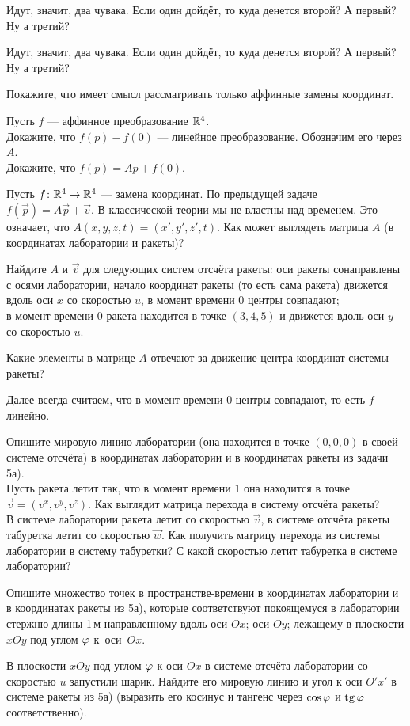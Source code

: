 \documentclass[a4paper,12pt]{article}
\begin{document}
  Идут, значит, два чувака.
    Если один дойдёт, то куда денется второй?
    А первый?
    Ну а третий?

  Идут, значит, два чувака.
    Если один дойдёт, то куда денется второй?
    А первый?
    Ну а третий?


  Покажите, что имеет смысл рассматривать только аффинные замены координат.

  Пусть $f$ --- аффинное преобразование $\mathbb{R}^4$.\\
    Докажите, что $f(p)-f(0)$ --- линейное преобразование. Обозначим его через $A$.\\
    Докажите, что $f(p) = Ap + f(0)$.


  Пусть $f\colon\mathbb{R}^4\rightarrow\mathbb{R}^4$ --- замена координат. По предыдущей задаче $f(\vec{p}) = A\vec{p} + \vec{v}$. В классической теории мы не властны над временем. Это означает, что $A(x,y,z,t)=(x',y',z',t)$.
  Как может выглядеть матрица $A$ (в координатах лаборатории и ракеты)?

  Найдите $A$ и $\vec{v}$ для следующих систем отсчёта ракеты:
    оси ракеты сонаправлены с осями лаборатории, начало координат ракеты (то есть сама ракета) движется вдоль оси $x$ со скоростью $u$, в момент времени $0$ центры совпадают;
\\
    в момент времени $0$ ракета находится в точке $(3,4,5)$ и движется вдоль оси $y$ со скоростью $u$.

  Какие элементы в матрице $A$ отвечают за движение центра координат системы ракеты?

Далее всегда считаем, что в момент времени $0$ центры совпадают, то есть $f$ линейно.

    Опишите мировую линию лаборатории (она находится в точке $(0,0,0)$ в своей системе отсчёта) в координатах лаборатории и в координатах ракеты из задачи 5а).\\
    Пусть ракета летит так, что в момент времени $1$ она находится в точке $\vec{v}=(v^x,v^y,v^z)$. Как выглядит матрица перехода в систему отсчёта ракеты?\\
    В системе лаборатории ракета летит со скоростью $\vec{v}$, в системе отсчёта ракеты табуретка летит со скоростью $\vec{w}$. Как получить матрицу перехода из системы лаборатории в систему табуретки? С какой скоростью летит табуретка в системе лаборатории?

  Опишите множество точек в пространстве-времени в координатах лаборатории и в координатах ракеты из 5а), которые соответствуют покоящемуся в лаборатории стержню длины 1\,м направленному вдоль  оси $Ox$;  оси $Oy$;  лежащему в плоскости $xOy$ под углом $\varphi$ к~оси~$Ox$.

  В плоскости $xOy$ под углом $\varphi$ к оси $Ox$ в системе отсчёта лаборатории со скоростью $u$ запустили шарик. Найдите его мировую линию и угол к оси $O'x'$ в системе ракеты из 5а) (выразить его косинус и тангенс через $\cos\varphi$ и $\tg\ph$ соответственно).

\end{document}
